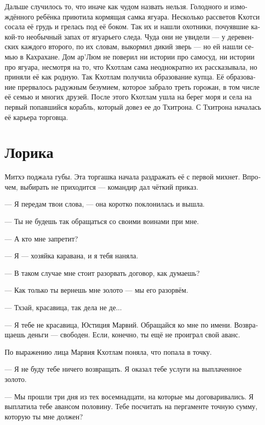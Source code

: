 \documentclass[a4paper,12pt,fleqn]{book}\usepackage{cooltooltips}\usepackage{polyglossia}\setdefaultlanguage{russian}\setotherlanguage{english}\defaultfontfeatures{Ligatures=TeX,Mapping=tex-text} \usepackage{xcolor}\definecolor{lightgray}{HTML}{bbbbbb}\color{lightgray}\newcommand{\ml}[3]{\textenglish{\textcolor{black}{#3}}}
\newcommand{\asterism}{\vspace{1em}{\centering\Large\bfseries$\ast~\ast~\ast$\par}\vspace{1em}}
\begin{document}
Дальше случилось то, что иначе как чудом назвать нельзя.
Голодного и измождённого ребёнка приютила кормящая самка ягуара.
Несколько рассветов Кхотси сосала её грудь и грелась под её боком.
Так их и нашли охотники, почуявшие какой-то необычный запах от ягуарьего следа.
Чуда они не увидели --- у деревенских каждого второго, по их словам, выкормил дикий зверь --- но ей нашли семью в Кахрахане.
Дом ар'Люм не поверил ни истории про самосуд, ни истории про ягуара, несмотря на то, что Кхотлам сама неоднократно их рассказывала, но приняли её как родную.
Так Кхотлам получила образование купца.
Её образование прервалось радужным безумием, которое забрало треть горожан, в том числе её семью и многих друзей.
После этого Кхотлам ушла на берег моря и села на первый попавшийся корабль, который довез ее до Тхитрона.
С Тхитрона началась её карьера торговца.

\chapter{Лорика}

Митхэ поджала губы.
Эта торгашка начала раздражать её с первой михнет.
Впрочем, выбирать не приходится --- командир дал чёткий приказ.

--- Я передам твои слова, --- она коротко поклонилась и вышла.

\asterism

--- Ты не будешь так обращаться со своими воинами при мне.

--- А кто мне запретит?

--- Я --- хозяйка каравана, и я тебя наняла.

--- В таком случае мне стоит разорвать договор, как думаешь?

--- Как только ты вернешь мне золото --- мы его разорвём.

--- Тхэай, красавица, так дела не де...

--- Я тебе не красавица, Юстиция Марвий.
Обращайся ко мне по имени.
Возвращаешь деньги --- свободен.
Если, конечно, ты ещё не проиграл свой аванс.

По выражению лица Марвия Кхотлам поняла, что попала в точку.

--- Я не буду тебе ничего возвращать.
Я оказал тебе услуги на выплаченное золото.

--- Мы прошли три дня из тех восемнадцати, на которые мы договаривались.
Я выплатила тебе авансом половину.
Тебе посчитать на пергаменте точную сумму, которую ты мне должен?
\end{document}
